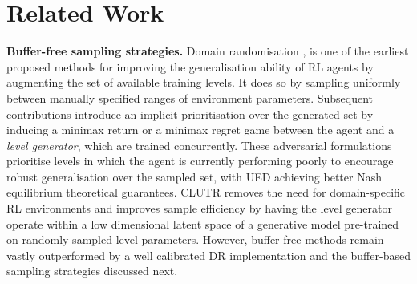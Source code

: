 \section{Related Work}\label{c3:sec:rw}
\textbf{Buffer-free sampling strategies.} Domain randomisation \citep[DR,][]{tobin2017domain, DR1997}, is one of the earliest proposed methods for improving the generalisation ability of RL agents by augmenting the set of available training levels. It does so by sampling uniformly between manually specified ranges of environment parameters. Subsequent contributions introduce an implicit prioritisation over the generated set by inducing a minimax return \citep[robust adversarial RL,][]{Pinto2017RobustAdversarialRL} or a minimax regret game \citep[UED,][]{PAIRED} between the agent and a \textit{level generator}, which are trained concurrently. These adversarial formulations prioritise levels in which the agent is currently performing poorly to encourage robust generalisation over the sampled set, with UED achieving better Nash equilibrium theoretical guarantees. CLUTR \citep{CLUTR} removes the need for domain-specific RL environments and improves sample efficiency by having the level generator operate within a low dimensional latent space of a generative model pre-trained on randomly sampled level parameters. However, buffer-free methods remain vastly outperformed by a well calibrated DR implementation and the buffer-based sampling strategies discussed next.

